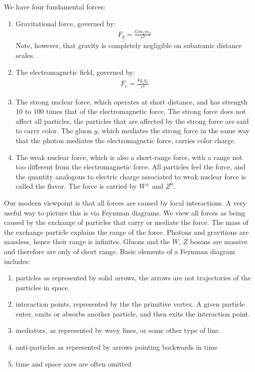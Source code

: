 \documentclass[11pt]{article}
\theoremstyle{break}
\theoremstyle{break}
\begin{document}
We have four fundamental forces:
\begin{enumerate}
\item Gravitational force, governed by:
\begin{align*}
F_g = \frac{Gm_1m_2}{r^2}
\end{align*}
Note, however, that gravity is completely negligible on subatomic distance scales.
\item The electromagnetic field, governed by:
\begin{align*}
F_e = \frac{kq_1q_2}{r^2}
\end{align*}
\item The strong nuclear force, which operates at short distance, and has strength $10$ to $100$ times that of the electromagnetic force. The strong force does not affect all particles, the particles that are affected by the strong force are said to carry color. The gluon $g$, which mediates the strong force in the same way that the photon mediates
the electromagnetic force, carries color charge.
\item The weak nuclear force, which is also a short-range force, with a range not too different from the electromagnetic force. All particles feel the force, and the quantity analogous to electric charge associated to weak nuclear force is called the flavor. The force is carried by $W^\pm$ and $Z^0$.
\end{enumerate}

Our modern viewpoint is that all forces are caused by local interactions. A very useful way to picture this is via Feynman diagrams. We view all forces as being caused by the exchange of particles that carry or mediate the force. The mass of the exchange particle explains the range of the force. Photons and gravitions are
massless, hence their range is infinites. Gluons and the $W$, $Z$ bosons are massive and therefore are only of short range. Basic elements of a Feynman diagram includes:
\begin{enumerate}[topsep=3pt,itemsep=-1ex,partopsep=1ex,parsep=1ex]
\item particles as represented by solid arrows, the arrows are not trajectories of the particles in space.
\item interaction points, represented by the the primitive vertex. A given particle enter, emits or absorbs another particle, and then exits the interaction point.
\item mediators, as represented by wavy lines, or some other type of line.
\item anti-particles as represented by arrows pointing backwards in time
\item time and space axes are often omitted
\end{enumerate}
\end{document}
